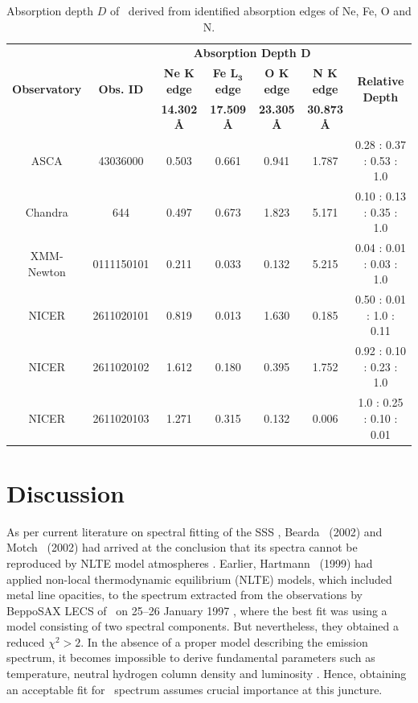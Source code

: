 			\begin{landscape}
		    \renewcommand{\arraystretch}{2.2}
		    \begin{table}[!htb]
		    	\centering
		    	\caption{Absorption depth $D$ of \source\ derived from identified absorption edges of Ne, Fe, O and N.}
		    	\label{tab:abs-depth}
				\begin{tabular}{ccccccc}
					\hline
					\multirow{3}{*}{\textbf{Observatory}} & \multirow{3}{*}{\textbf{Obs. ID}} & \multicolumn{4}{c}{\textbf{Absorption Depth $\boldsymbol{D}$}} & \multirow{3}{*}{\textbf{Relative Depth}} \\ \cline{3-6} & & \textbf{Ne $\boldsymbol{K}$ edge} & \textbf{Fe $\boldsymbol{L_3}$ edge} & \textbf{O $\boldsymbol{K}$ edge} & \textbf{N $\boldsymbol{K}$ edge} \\ \cline{3-6} & & \textbf{14.302 \AA} & \textbf{17.509 \AA} & \textbf{23.305 \AA} & \textbf{30.873 \AA} \\
					\hline
					{ASCA} & {43036000} & {0.503} & {0.661} & {0.941} & {1.787} & {0.28 : 0.37 : 0.53 : 1.0} \\ %
					{Chandra} & {644} & {0.497} & {0.673} & {1.823} & {5.171} & {0.10 : 0.13 : 0.35 : 1.0} \\ %
					{XMM-Newton} & {0111150101} & {0.211} & {0.033} & {0.132} & {5.215} & {0.04 : 0.01 : 0.03 : 1.0} \\ %
					{NICER} & {2611020101} & {0.819} & {0.013} & {1.630} & {0.185} & {0.50 : 0.01 : 1.0 : 0.11} \\ %
					{NICER} & {2611020102} & {1.612} & {0.180} & {0.395} & {1.752} & {0.92 : 0.10 : 0.23 : 1.0} \\ %
					{NICER} & {2611020103} & {1.271} & {0.315} & {0.132} & {0.006} & {1.0 : 0.25 : 0.10 : 0.01} \\ %
					\hline
				\end{tabular}
			\end{table}
			\renewcommand{\arraystretch}{1.6}
		    \end{landscape}

    	
    \section{Discussion} \label{multi-obs:discussion}
    	As per current literature on spectral fitting of the SSS \source, Bearda \etal\ (2002) and Motch \etal\ (2002) had arrived at the conclusion that its spectra cannot be reproduced by NLTE model atmospheres \cite{beardaChandra2002AA,motchXmmNewton2002AA}. Earlier, Hartmann \etal\ (1999) had applied non-local thermodynamic equilibrium (NLTE) models, which included metal line opacities, to the spectrum extracted from the observations by BeppoSAX LECS of \source\ on 25--26 January 1997 \cite{hartmann1999constraining}, where the best fit was using a model consisting of two spectral components. But nevertheless, they obtained a reduced $\chi^2>2$. In the absence of a proper model describing the emission spectrum, it becomes impossible to
derive fundamental parameters such as temperature, neutral hydrogen column density and luminosity \cite{motchXmmNewton2002AA}. Hence, obtaining an acceptable fit for \source\ spectrum assumes crucial importance at this juncture.
    
